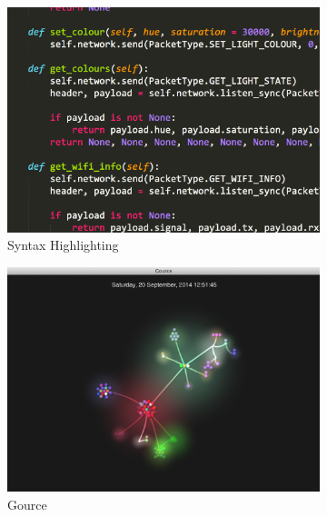 \begin{figure}
\centering
\begin{subfigure}{.5\textwidth}
  \centering
  \includegraphics[width=.95\linewidth]{../images/code-visualisations/syntax-highlighting.png}
  \caption{Syntax Highlighting}
  \label{fig:syntax-highlighting}
\end{subfigure}%
\begin{subfigure}{.5\textwidth}
  \centering
  \includegraphics[width=.95\linewidth]{../images/code-visualisations/gource.png}
  \caption{Gource}
  \label{fig:gource}
\end{subfigure}\\
\begin{subfigure}{.5\textwidth}
  \centering

\end{subfigure}
\end{figure}
